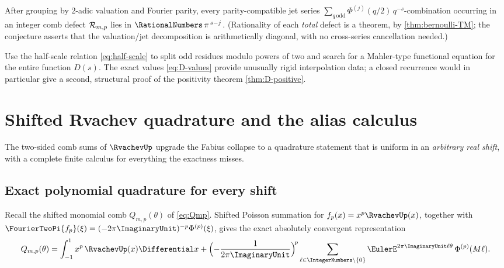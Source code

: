 \begin{conjecture}
\label{conj:jets}
After grouping by $2$-adic valuation and Fourier parity, every
parity-compatible jet series
$\sum_{q\,\mathrm{odd}}\Phi^{(j)}(q/2)\,q^{-s}$-combination occurring
in an integer comb defect $\mathcal R_{m,p}$ lies in
$\RationalNumbers\,\pi^{\,s-j}$.  (Rationality of each \emph{total} defect is a
theorem, by \cref{thm:bernoulli-TM}; the conjecture asserts that the
valuation/jet decomposition is arithmetically diagonal, with no
cross-series cancellation needed.)
\end{conjecture}

\begin{problem}
\label{prob:D-recurrence}
Use the half-scale relation \eqref{eq:half-scale} to split odd residues
modulo powers of two and search for a Mahler-type functional equation
for the entire function $D(s)$.  The exact values
\eqref{eq:D-values} provide unusually rigid interpolation data; a
closed recurrence would in particular give a second, structural proof
of the positivity theorem \cref{thm:D-positive}.
\end{problem}

\section{Shifted Rvachev quadrature and the alias calculus}
\label{sec:up-comb}

The two-sided comb sums of $\RvachevUp$ upgrade the Fabius collapse to a
quadrature statement that is uniform in an \emph{arbitrary real
shift}, with a complete finite calculus for everything the exactness
misses.

\subsection{Exact polynomial quadrature for every shift}

Recall the shifted monomial comb
$Q_{m,p}(\theta)$ of \eqref{eq:Qmp}.  Shifted Poisson summation for
$f_p(x)=x^{p}\RvachevUp(x)$, together with
$\FourierTwoPi{f_p}(\xi)=(-2\pi\ImaginaryUnit)^{-p}\Phi^{(p)}(\xi)$, gives the exact
absolutely convergent representation
\begin{equation}
 Q_{m,p}(\theta)
 =\int_{-1}^{1}x^{p}\,\RvachevUp(x)\Differential x
 +\Bigl(-\frac{1}{2\pi\ImaginaryUnit}\Bigr)^{\!p}
 \sum_{\ell\in\IntegerNumbers\setminus\{0\}}
 \EulerE^{2\pi\ImaginaryUnit\ell\theta}\,\Phi^{(p)}(M\ell).
 \label{eq:Q-Poisson}
\end{equation}

